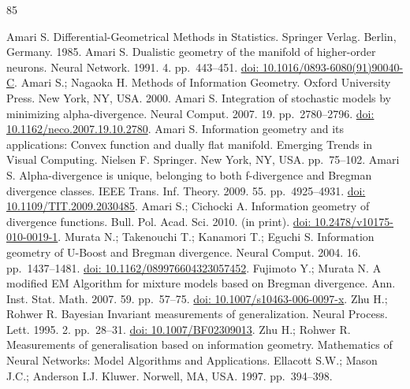 \begin{thebibliography}{85}
\raggedright
{}\hypertarget{B1-entropy-12-01532}{} Amari S. Differential-Geometrical Methods in Statistics. Springer Verlag. Berlin, Germany. 1985.
\hypertarget{B2-entropy-12-01532}{} Amari S. Dualistic geometry of the manifold of higher-order neurons. Neural Network. 1991. 4. pp.~443--451. \href{https://doi.org/10.1016/0893-6080(91)90040-C}{doi: 10.1016/0893-6080(91)90040-C}.
\hypertarget{B3-entropy-12-01532}{} Amari S.; Nagaoka H. Methods of Information Geometry. Oxford University Press. New York, NY, USA. 2000.
\hypertarget{B4-entropy-12-01532}{} Amari S. Integration of stochastic models by minimizing alpha-divergence. Neural Comput. 2007. 19. pp.~2780--2796. \href{https://doi.org/10.1162/neco.2007.19.10.2780}{doi: 10.1162/neco.2007.19.10.2780}.
\hypertarget{B5-entropy-12-01532}{} Amari S. Information geometry and its applications: Convex function and dually flat manifold. Emerging Trends in Visual Computing. Nielsen F. Springer. New York, NY, USA. pp.~75--102.
\hypertarget{B6-entropy-12-01532}{} Amari S. Alpha-divergence is unique, belonging to both f-divergence and Bregman divergence classes. IEEE Trans. Inf. Theory. 2009. 55. pp.~4925--4931. \href{https://doi.org/10.1109/TIT.2009.2030485}{doi: 10.1109/TIT.2009.2030485}.
\hypertarget{B7-entropy-12-01532}{} Amari S.; Cichocki A. Information geometry of divergence functions. Bull. Pol. Acad. Sci. 2010. (in print). \href{https://doi.org/10.2478/v10175-010-0019-1}{doi: 10.2478/v10175-010-0019-1}.
\hypertarget{B8-entropy-12-01532}{} Murata N.; Takenouchi T.; Kanamori T.; Eguchi S. Information geometry of U-Boost and Bregman divergence. Neural Comput. 2004. 16. pp.~1437--1481. \href{https://doi.org/10.1162/089976604323057452}{doi: 10.1162/089976604323057452}.
\hypertarget{B9-entropy-12-01532}{} Fujimoto Y.; Murata N. A modified EM Algorithm for mixture models based on Bregman divergence. Ann. Inst. Stat. Math. 2007. 59. pp.~57--75. \href{https://doi.org/10.1007/s10463-006-0097-x}{doi: 10.1007/s10463-006-0097-x}.
\hypertarget{B10-entropy-12-01532}{} Zhu H.; Rohwer R. Bayesian Invariant measurements of generalization. Neural Process. Lett. 1995. 2. pp.~28--31. \href{https://doi.org/10.1007/BF02309013}{doi: 10.1007/BF02309013}.
\hypertarget{B11-entropy-12-01532}{} Zhu H.; Rohwer R. Measurements of generalisation based on information geometry. Mathematics of Neural Networks: Model Algorithms and Applications. Ellacott S.W.; Mason J.C.; Anderson I.J. Kluwer. Norwell, MA, USA. 1997. pp.~394--398.

\end{thebibliography}
